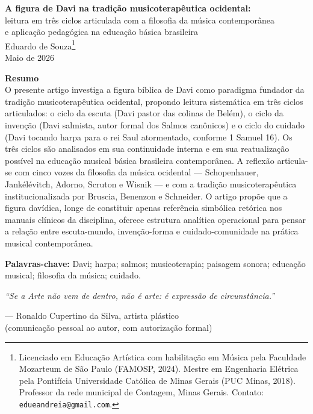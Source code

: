 \documentclass[12pt,a4paper]{article}
\begin{document}
\begin{center}
{\Large\bfseries A figura de Davi na tradição musicoterapêutica ocidental:}\\[0.5em]
{\large leitura em três ciclos articulada com a filosofia da música contemporânea\\e aplicação pedagógica na educação básica brasileira}\\[1.5em]
{Eduardo de Souza\footnote{Licenciado em Educação Artística com habilitação em Música pela Faculdade Mozarteum de São Paulo (FAMOSP, 2024). Mestre em Engenharia Elétrica pela Pontifícia Universidade Católica de Minas Gerais (PUC Minas, 2018). Professor da rede municipal de Contagem, Minas Gerais. Contato: \texttt{edueandreia@gmail.com}.}}\\[0.5em]
{\small Maio de 2026}
\end{center}

\vspace{1em}

\noindent\textbf{Resumo}\\[0.5em]
{\small\noindent O presente artigo investiga a figura bíblica de Davi como paradigma fundador da tradição musicoterapêutica ocidental, propondo leitura sistemática em três ciclos articulados: o ciclo da escuta (Davi pastor das colinas de Belém), o ciclo da invenção (Davi salmista, autor formal dos Salmos canônicos) e o ciclo do cuidado (Davi tocando harpa para o rei Saul atormentado, conforme 1 Samuel 16). Os três ciclos são analisados em sua continuidade interna e em sua reatualização possível na educação musical básica brasileira contemporânea. A reflexão articula-se com cinco vozes da filosofia da música ocidental --- Schopenhauer, Jankélévitch, Adorno, Scruton e Wisnik --- e com a tradição musicoterapêutica institucionalizada por Bruscia, Benenzon e Schneider. O artigo propõe que a figura davídica, longe de constituir apenas referência simbólica retórica nos manuais clínicos da disciplina, oferece estrutura analítica operacional para pensar a relação entre escuta-mundo, invenção-forma e cuidado-comunidade na prática musical contemporânea.}

\vspace{0.5em}
\noindent\textbf{Palavras-chave:} Davi; harpa; salmos; musicoterapia; paisagem sonora; educação musical; filosofia da música; cuidado.

\vspace{1.5em}

\begin{flushright}
\begin{minipage}{0.65\textwidth}
\itshape\small
``Se a Arte não vem de dentro, não é arte: é expressão de circunstância.''

\upshape\rmfamily\normalsize\flushright
--- Ronaldo Cupertino da Silva, artista plástico\\
(comunicação pessoal ao autor, com autorização formal)
\end{minipage}
\end{flushright}
\end{document}
